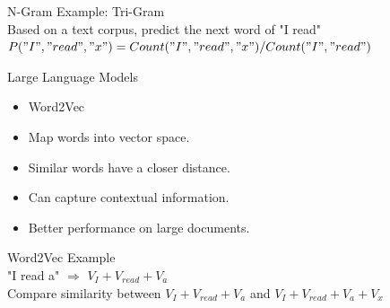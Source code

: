 \documentclass[t]{beamer}
\begin{document}
\begin{frame}{N-Gram}
\vspace{1cm}
Example: Tri-Gram \\
\vspace{1cm}
Based on a text corpus, predict the next word of "I read"\\
\vspace{1cm}
$P("I","read","x") = Count("I","read","x")/Count("I","read")$
\end{frame}

\begin{frame}{Large Language Models}
  \vspace{3cm}
  \centering
\vspace{1cm}
\begin{itemize}
  \item Word2Vec \cite{Mikolov13}
  \item Map words into vector space.
  \item Similar words have a closer distance.
  \item Can capture contextual information.
  \item Better performance on large documents.
\end{itemize}
\end{frame}

\begin{frame}{Word2Vec}
  \vspace{1cm}
  Example \\
  \vspace{1cm}
  "I read a" $\Rightarrow$ $V_{I} + V_{read} + V_a$ \\
  \vspace{1cm}
  Compare similarity between $V_I + V_{read} + V_a$ and $V_I + V_{read} + V_a + V_x$
\end{frame}
\end{document}
